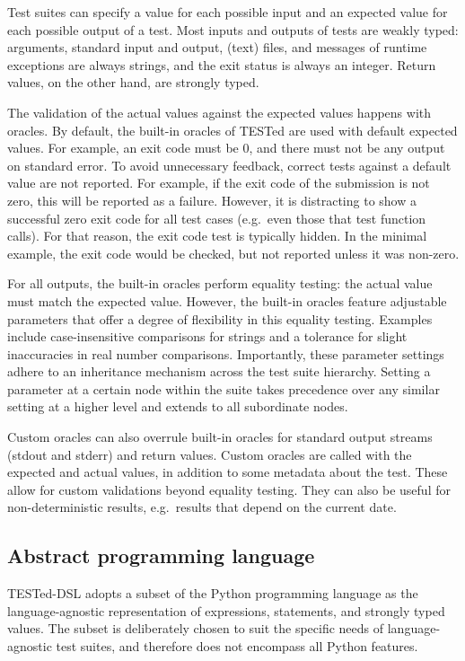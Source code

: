 \documentclass[../main]{subfiles}
\begin{document}
Test suites can specify a value for each possible input and an expected value for each possible output of a test.
Most inputs and outputs of tests are weakly typed: arguments, standard input and output, (text) files, and messages of runtime exceptions are always strings, and the exit status is always an integer.
Return values, on the other hand, are strongly typed.

The validation of the actual values against the expected values happens with oracles.
By default, the built-in oracles of TESTed are used with default expected values.
For example, an exit code must be 0, and there must not be any output on standard error.
To avoid unnecessary feedback, correct tests against a default value are not reported.
For example, if the exit code of the submission is not zero, this will be reported as a failure.
However, it is distracting to show a successful zero exit code for all test cases (e.g.\ even those that test function calls).
For that reason, the exit code test is typically hidden.
In the minimal example, the exit code would be checked, but not reported unless it was non-zero.

For all outputs, the built-in oracles perform equality testing: the actual value must match the expected value.
However, the built-in oracles feature adjustable parameters that offer a degree of flexibility in this equality testing.
Examples include case-insensitive comparisons for strings and a tolerance for slight inaccuracies in real number comparisons.
Importantly, these parameter settings adhere to an inheritance mechanism across the test suite hierarchy.
Setting a parameter at a certain node within the suite takes precedence over any similar setting at a higher level and extends to all subordinate nodes.

Custom oracles can also overrule built-in oracles for standard output streams (stdout and stderr) and return values.
Custom oracles are called with the expected and actual values, in addition to some metadata about the test.
These allow for custom validations beyond equality testing.
They can also be useful for non-deterministic results, e.g.\ results that depend on the current date.

\subsection{Abstract programming language}\label{subsec:dsl-abstract-programming-language}

TESTed-DSL adopts a subset of the Python programming language as the language-agnostic representation of expressions, statements, and strongly typed values.
The subset is deliberately chosen to suit the specific needs of language-agnostic test suites, and therefore does not encompass all Python features.
\end{document}
